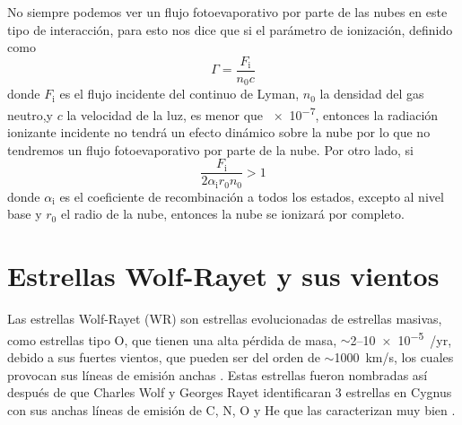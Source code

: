 \documentclass{book}
\begin{document}
No siempre podemos ver un flujo fotoevaporativo por parte de las nubes en este tipo de interacción, para esto \cite{Bertoldi_1989} nos dice que si el parámetro de ionización, definido como 
\begin{equation}
    \Gamma  = \frac{F_\mathrm{i}}{n_0 c}
\end{equation}
donde $F_\mathrm{i}$ es el flujo incidente del continuo de Lyman, $n_0$ la densidad del gas neutro,y $c$ la velocidad de la luz, es menor que \SI{e-7}{}, entonces la radiación ionizante incidente no tendrá un efecto dinámico sobre la nube por lo que no tendremos un flujo fotoevaporativo por parte de la nube. Por otro lado, si 
\begin{equation}
    \frac{F_\mathrm{i}}{2\alpha_\mathrm{i} r_0 n_0}>1
\end{equation}
donde $\alpha_\mathrm{i}$ es el coeficiente de recombinación a todos los estados, excepto al nivel base y $r_0$ el radio de la nube, entonces la nube se ionizará por completo.


\section{Estrellas Wolf-Rayet y sus vientos}

Las estrellas Wolf-Rayet (WR) son estrellas evolucionadas de estrellas masivas, como estrellas tipo O, que tienen una alta pérdida de masa,  $\sim$2--\SI{10e-5}{\msun/yr}, debido a sus fuertes vientos, que pueden ser del orden de $\sim$\SI{1000}{km/s}, los cuales provocan sus líneas de emisión anchas \citep{Hamman:2006}. Estas estrellas fueron nombradas así después de que Charles Wolf y Georges Rayet identificaran 3 estrellas en Cygnus con sus  anchas líneas de emisión de C, N, O y He que las caracterizan muy bien \citep{WR:ref}. 
\end{document}

